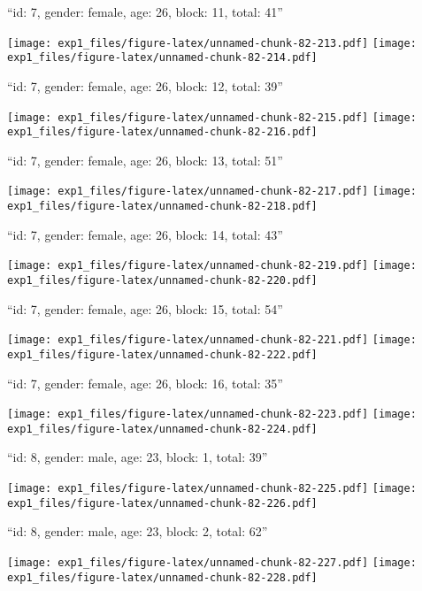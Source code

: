 \documentclass[11pt,,]{article}
\begin{document}
\newpage
[1] 

``id: 7, gender: female, age: 26, block: 11, total: 41''

\texttt{[image: exp1\_files/figure-latex/unnamed-chunk-82-213.pdf]}
\texttt{[image: exp1\_files/figure-latex/unnamed-chunk-82-214.pdf]}

\newpage
[1] 

``id: 7, gender: female, age: 26, block: 12, total: 39''

\texttt{[image: exp1\_files/figure-latex/unnamed-chunk-82-215.pdf]}
\texttt{[image: exp1\_files/figure-latex/unnamed-chunk-82-216.pdf]}

\newpage
[1] 

``id: 7, gender: female, age: 26, block: 13, total: 51''

\texttt{[image: exp1\_files/figure-latex/unnamed-chunk-82-217.pdf]}
\texttt{[image: exp1\_files/figure-latex/unnamed-chunk-82-218.pdf]}

\newpage
[1] 

``id: 7, gender: female, age: 26, block: 14, total: 43''

\texttt{[image: exp1\_files/figure-latex/unnamed-chunk-82-219.pdf]}
\texttt{[image: exp1\_files/figure-latex/unnamed-chunk-82-220.pdf]}

\newpage
[1] 

``id: 7, gender: female, age: 26, block: 15, total: 54''

\texttt{[image: exp1\_files/figure-latex/unnamed-chunk-82-221.pdf]}
\texttt{[image: exp1\_files/figure-latex/unnamed-chunk-82-222.pdf]}

\newpage
[1] 

``id: 7, gender: female, age: 26, block: 16, total: 35''

\texttt{[image: exp1\_files/figure-latex/unnamed-chunk-82-223.pdf]}
\texttt{[image: exp1\_files/figure-latex/unnamed-chunk-82-224.pdf]}

\newpage
[1] 

``id: 8, gender: male, age: 23, block: 1, total: 39''

\texttt{[image: exp1\_files/figure-latex/unnamed-chunk-82-225.pdf]}
\texttt{[image: exp1\_files/figure-latex/unnamed-chunk-82-226.pdf]}

\newpage
[1] 

``id: 8, gender: male, age: 23, block: 2, total: 62''

\texttt{[image: exp1\_files/figure-latex/unnamed-chunk-82-227.pdf]}
\texttt{[image: exp1\_files/figure-latex/unnamed-chunk-82-228.pdf]}
\end{document}
